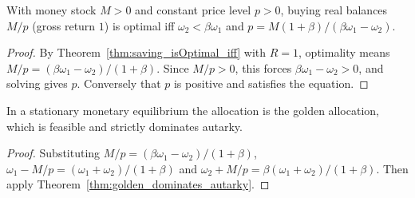 \begin{theorem}
\label{thm:samuelson_monetary}
\leanok
{}
With money stock $M > 0$ and constant price level $p > 0$, buying real balances $M/p$ (gross return $1$) is optimal iff
$\omega_2 < \beta\omega_1$ and $p = M(1+\beta)/(\beta\omega_1 - \omega_2)$.
\end{theorem}
\begin{proof}
\leanok
By Theorem~\ref{thm:saving_isOptimal_iff} with $R = 1$, optimality means $M/p = (\beta\omega_1 - \omega_2)/(1+\beta)$. Since
$M/p > 0$, this forces $\beta\omega_1 - \omega_2 > 0$, and solving gives $p$. Conversely that $p$ is positive and satisfies
the equation.
\end{proof}

\begin{theorem}
\label{thm:monetary_dominates}
\leanok
{}
In a stationary monetary equilibrium the allocation is the golden allocation, which is feasible and strictly
dominates autarky.
\end{theorem}
\begin{proof}
\leanok
Substituting $M/p = (\beta\omega_1 - \omega_2)/(1+\beta)$, $\omega_1 - M/p = (\omega_1 + \omega_2)/(1+\beta)$ and
$\omega_2 + M/p = \beta(\omega_1 + \omega_2)/(1+\beta)$. Then apply Theorem~\ref{thm:golden_dominates_autarky}.
\end{proof}
